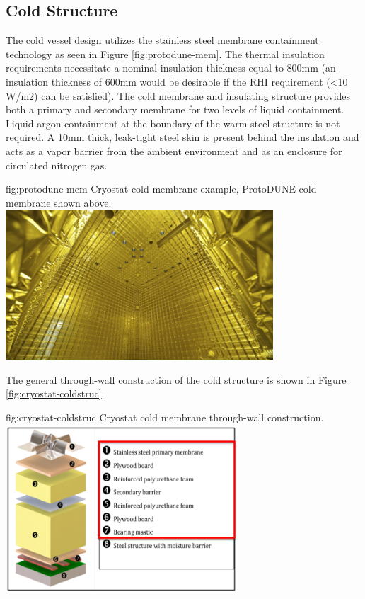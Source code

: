\subsection{Cold Structure}
\label{sec:cryost-des-cold}
The cold vessel design utilizes the stainless steel membrane containment technology as seen in Figure \ref{fig:protodune-mem}. The thermal insulation requirements necessitate a nominal insulation thickness equal to 800mm (an insulation thickness of 600mm would be desirable if the RHI requirement (<10 W/m2) can be satisfied).  The cold membrane and insulating structure provides both a primary and secondary membrane for two levels of liquid containment.  Liquid argon containment at the boundary of the warm steel structure is not required.  A 10mm thick, leak-tight steel skin is present behind the insulation and acts as a vapor barrier from the ambient environment and as an enclosure for circulated nitrogen gas.

\begin{dunefigure}{fig:protodune-mem}
{Cryostat cold membrane example, ProtoDUNE cold membrane shown above.}
\includegraphics[width=0.75\textwidth]{graphics/cryostat/protodune-mem.png}
\end{dunefigure}

The general through-wall construction of the cold structure is shown in Figure \ref{fig:cryostat-coldstruc}.

\begin{dunefigure}{fig:cryostat-coldstruc}
{Cryostat cold membrane through-wall construction.}
\includegraphics[width=0.65\textwidth]{graphics/cryostat/cryostat-coldstruc.png}
\end{dunefigure}


